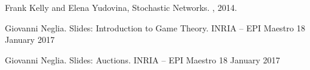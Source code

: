 \begin{thebibliography}{alpha}
	
	 Frank Kelly and Elena Yudovina,
	\newblock Stochastic Networks.
	, 2014.
	
	 Giovanni Neglia.
	\newblock Slides: Introduction to Game Theory.
    \newblock  INRIA – EPI Maestro 18 January 2017
    
     Giovanni Neglia.
	\newblock Slides: Auctions.
    \newblock INRIA – EPI Maestro 18 January 2017
	
\end{thebibliography}
